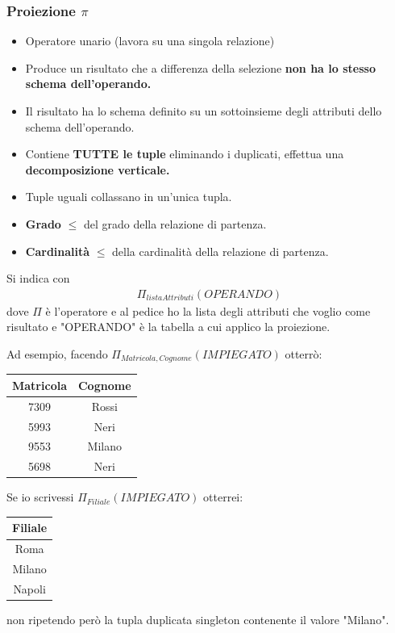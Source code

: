 \documentclass{article}
\newcounter{esempio}
\begin{document}
\subsubsection{Proiezione $\pi$}
\begin{itemize}
    \item Operatore unario (lavora su una singola relazione)
    \item Produce un risultato che a differenza della selezione \textbf{non ha lo stesso schema dell'operando.}
    \item Il risultato ha lo schema definito su un sottoinsieme degli attributi dello schema dell'operando.
    \item Contiene \textbf{TUTTE le tuple} eliminando i duplicati, effettua una \textbf{decomposizione verticale.}
    \item Tuple uguali collassano in un'unica tupla.
    \item \textbf{Grado} $\boldsymbol{\leq}$ del grado della relazione di partenza.
    \item \textbf{Cardinalità} $\boldsymbol{\leq}$ della cardinalità della relazione di partenza. 
\end{itemize}
Si indica con
    \begin{align*}
        \Pi_{listaAttributi}(OPERANDO)
    \end{align*}
dove $\Pi$ è l'operatore e al pedice ho la lista degli attributi che voglio come risultato e "OPERANDO" è la tabella a cui applico la proiezione.

Ad esempio, facendo $\Pi_{Matricola, Cognome} (IMPIEGATO)$ otterrò:
    \begin{tabular}{|c|c|}
        \hline
        \textbf{Matricola} & \textbf{Cognome} \\
        \hline
        7309 & Rossi \\
        \hline
        5993 & Neri  \\
        \hline
        9553 & Milano \\
        \hline
        5698 & Neri \\
        \hline
    \end{tabular}

Se io scrivessi $\Pi_{Filiale} (IMPIEGATO)$ otterrei: 
    \begin{tabular}{|c|}
        \hline
        \textbf{Filiale} \\
        \hline
        Roma \\
        \hline
        Milano \\
        \hline
        Napoli \\
        \hline
    \end{tabular}
 non ripetendo però la tupla duplicata singleton contenente il valore "Milano".
\end{document}
